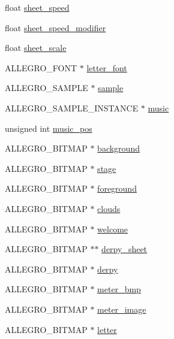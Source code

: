 \begin{DoxyCompactItemize}
float \hyperlink{structLevel_a41db1345ac158898450907010a49748f}{sheet\-\_\-speed}
\item 
float \hyperlink{structLevel_a3cae10fd441bcc14b6a47dd5fedafa59}{sheet\-\_\-speed\-\_\-modifier}
\item 
float \hyperlink{structLevel_a267a140bd3de1fc3f23a88623de425ed}{sheet\-\_\-scale}
\item 
A\-L\-L\-E\-G\-R\-O\-\_\-\-F\-O\-N\-T $\ast$ \hyperlink{structLevel_a69e6eae14648fd488a1dec0f55e4d293}{letter\-\_\-font}
\item 
A\-L\-L\-E\-G\-R\-O\-\_\-\-S\-A\-M\-P\-L\-E $\ast$ \hyperlink{structLevel_a234fa7b9ec35dd360e4e3c48a944fc7d}{sample}
\item 
A\-L\-L\-E\-G\-R\-O\-\_\-\-S\-A\-M\-P\-L\-E\-\_\-\-I\-N\-S\-T\-A\-N\-C\-E $\ast$ \hyperlink{structLevel_a41c6aae8f508e078b02c291e1d6f8e67}{music}
\item 
unsigned int \hyperlink{structLevel_a13e322deb3298846260af31324e5b492}{music\-\_\-pos}
\item 
A\-L\-L\-E\-G\-R\-O\-\_\-\-B\-I\-T\-M\-A\-P $\ast$ \hyperlink{structLevel_a4b4dd31284206502977b3d5b95d52abc}{background}
\item 
A\-L\-L\-E\-G\-R\-O\-\_\-\-B\-I\-T\-M\-A\-P $\ast$ \hyperlink{structLevel_ad412b858a4e688114dd89a44ecb005bb}{stage}
\item 
A\-L\-L\-E\-G\-R\-O\-\_\-\-B\-I\-T\-M\-A\-P $\ast$ \hyperlink{structLevel_a26c758ccdc7404a3ee0e766d1cbbf0be}{foreground}
\item 
A\-L\-L\-E\-G\-R\-O\-\_\-\-B\-I\-T\-M\-A\-P $\ast$ \hyperlink{structLevel_a27d34b57b66d4e7f733cb6a5cc16ff18}{clouds}
\item 
A\-L\-L\-E\-G\-R\-O\-\_\-\-B\-I\-T\-M\-A\-P $\ast$ \hyperlink{structLevel_a575fec7686bd94b5c35b15d73296c977}{welcome}
\item 
A\-L\-L\-E\-G\-R\-O\-\_\-\-B\-I\-T\-M\-A\-P $\ast$$\ast$ \hyperlink{structLevel_a0e02f3a5674a2ad3c23de22b6a4ed044}{derpy\-\_\-sheet}
\item 
A\-L\-L\-E\-G\-R\-O\-\_\-\-B\-I\-T\-M\-A\-P $\ast$ \hyperlink{structLevel_ae33832497116b7a0c184959bbde21ee5}{derpy}
\item 
A\-L\-L\-E\-G\-R\-O\-\_\-\-B\-I\-T\-M\-A\-P $\ast$ \hyperlink{structLevel_a4e78a54cbf3cdcc804f65acb03cef0b3}{meter\-\_\-bmp}
\item 
A\-L\-L\-E\-G\-R\-O\-\_\-\-B\-I\-T\-M\-A\-P $\ast$ \hyperlink{structLevel_a371c97dfa3d564a19648cb1b72edbf60}{meter\-\_\-image}
\item 
A\-L\-L\-E\-G\-R\-O\-\_\-\-B\-I\-T\-M\-A\-P $\ast$ \hyperlink{structLevel_af1b1699478b4633d76c01ea09e666df4}{letter}
$$
\end{DoxyCompactItemize}
